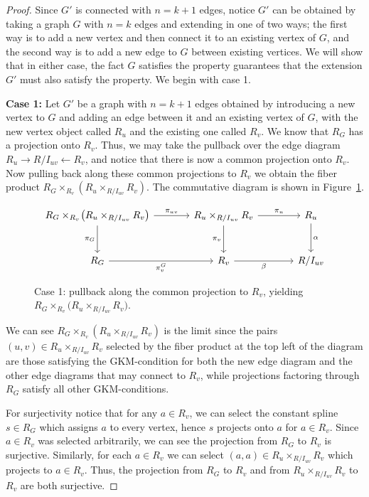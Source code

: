 \documentclass{article}
\begin{document}
\begin{proof}
Since $G'$ is connected with $n=k+1$ edges, notice $G'$ can be obtained by taking a graph $G$ with $n=k$ edges and extending in one of two ways; the first way is to add a new vertex and then connect it to an existing vertex of $G$, and the second way is to add a new edge to $G$ between existing vertices. We will show that in either case, the fact $G$ satisfies the property guarantees that the extension $G'$ must also satisfy the property. We begin with case 1.

\textbf{Case 1:} Let $G'$ be a graph with $n=k+1$ edges obtained by introducing a new vertex to $G$ and adding an edge between it and an existing vertex of $G$, with the new vertex object called $R_u$ and the existing one called $R_v$. We know that $R_{G}$ has a projection onto $R_v$. Thus, we may take the pullback over the edge diagram $R_u \rightarrow R/I_{uv} \leftarrow R_v$, and notice that there is now a common projection onto $R_v$. Now pulling back along these common projections to $R_v$ we obtain the fiber product $R_{G} \times_{R_v} (R_u \times_{R/I_{uv}} R_v)$. The commutative diagram is shown in Figure~\ref{fig:case1-pullback}.

\begin{figure}
\centering
\[
\begin{tikzcd}[ampersand replacement=\&, column sep=large, row sep=large]
  R_{G} \times_{R_v}\!\bigl(R_u \times_{R/I_{uv}} R_v\bigr)
    \arrow[d, "\pi_G"'] \arrow[r, "\pi_{uv}"]
    \arrow[dr, phantom, very near start]
  \& R_u \times_{R/I_{uv}} R_v
    \arrow[d, "\pi_v"'] \arrow[r, "\pi_u"]
    \arrow[dr, phantom, very near start]
  \& R_u \arrow[d, "\alpha"] \\
  R_{G} \arrow[r, "\pi^G_v"']
  \& R_v \arrow[r, "\beta"']
  \& R/I_{uv}
\end{tikzcd}
\]
\caption{Case 1: pullback along the common projection to \(R_v\), yielding \(R_{G} \times_{R_v}\bigl(R_u \times_{R/I_{uv}} R_v\bigr)\).}
\label{fig:case1-pullback}
\end{figure}

We can see $R_{G} \times_{R_v} (R_u \times_{R/I_{uv}} R_v)$ is the limit since the pairs $(u,v) \in R_u \times_{R/I_{uv}} R_v$ selected by the fiber product at the top left of the diagram are those satisfying the GKM-condition for both the new edge diagram and the other edge diagrams that may connect to $R_v$, while projections factoring through $R_{G}$ satisfy all other GKM-conditions. 

For surjectivity notice that for any $a \in R_v$, we can select the constant spline $s \in R_{G}$ which assigns $a$ to every vertex, hence $s$ projects onto $a$ for $a \in R_v$. Since $a \in R_v$ was selected arbitrarily, we can see the projection from $R_{G}$ to $R_v$ is surjective. Similarly, for each $a \in R_v$ we can select $(a,a) \in R_u \times_{R/I_{uv}} R_v$ which projects to $a \in R_v$. Thus, the projection from $R_{G}$ to $R_v$ and from $ R_u \times_{R/I_{uv}} R_v$ to $R_v$ are both surjective.


\end{proof}
\end{document}
